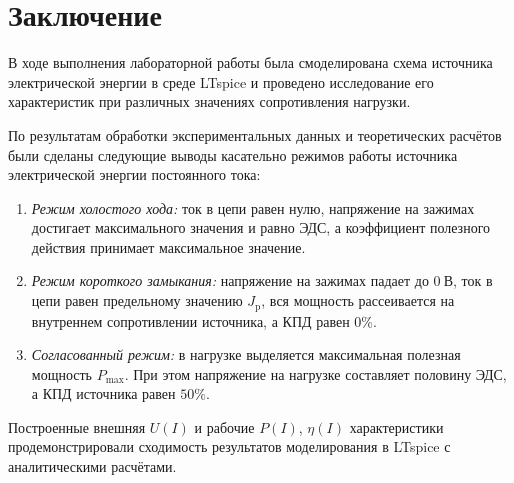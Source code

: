 \section{Заключение}

В ходе выполнения лабораторной работы была смоделирована схема источника электрической энергии в среде LTspice и проведено исследование его характеристик при различных значениях сопротивления нагрузки.

По результатам обработки экспериментальных данных и теоретических расчётов были сделаны следующие выводы касательно режимов работы источника электрической энергии постоянного тока:

\begin{enumerate}
    \item \textit{Режим холостого хода:} ток в цепи равен нулю, напряжение на зажимах достигает максимального значения и равно ЭДС, а коэффициент полезного действия принимает максимальное значение.
    \item \textit{Режим короткого замыкания:} напряжение на зажимах падает до $0~\text{В}$, ток в цепи равен предельному значению $J_{\mathrm{p}}$, вся мощность рассеивается на внутреннем сопротивлении источника, а КПД равен $0\%$.
    \item \textit{Согласованный режим:} в нагрузке выделяется максимальная полезная мощность $P_{\max}$. При этом напряжение на нагрузке составляет половину ЭДС, а КПД источника равен $50\%$.
\end{enumerate}

Построенные внешняя $U(I)$ и рабочие $P(I)$, $\eta(I)$ характеристики продемонстрировали сходимость результатов моделирования в LTspice с аналитическими расчётами.